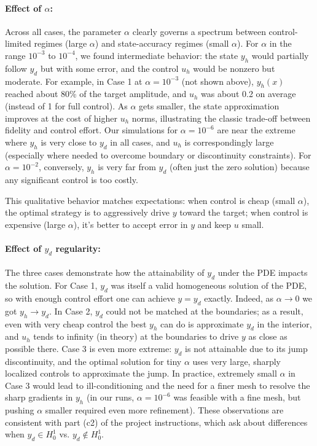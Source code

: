 \documentclass[a4paper,10pt]{article}
\begin{document}
\paragraph{Effect of $\alpha$:} Across all cases, the parameter $\alpha$ clearly governs a spectrum between control-limited regimes (large $\alpha$) and state-accuracy regimes (small $\alpha$). 
For $\alpha$ in the range $10^{-3}$ to $10^{-4}$, we found intermediate behavior: the state $y_h$ would partially follow $y_d$ but with some error, and the control $u_h$ would be nonzero but moderate. 
For example, in Case 1 at $\alpha=10^{-3}$ (not shown above), $y_h(x)$ reached about 80\% of the target amplitude, and $u_h$ was about 0.2 on average (instead of 1 for full control). As $\alpha$ gets smaller, the state approximation improves at the cost of higher $u_h$ norms, illustrating the classic trade-off between fidelity and control effort. Our simulations for $\alpha=10^{-6}$ are near the extreme where $y_h$ is very close to $y_d$ in all cases, and $u_h$ is correspondingly large (especially where needed to overcome boundary or discontinuity constraints). For $\alpha=10^{-2}$, conversely, $y_h$ is very far from $y_d$ (often just the zero solution) because any significant control is too costly.

This qualitative behavior matches expectations: when control is cheap (small $\alpha$), the optimal strategy is to aggressively drive $y$ toward the target; when control is expensive (large $\alpha$), it's better to accept error in $y$ and keep $u$ small.

\paragraph{Effect of $y_d$ regularity:} The three cases demonstrate how the attainability of $y_d$ under the PDE impacts the solution. For Case 1, $y_d$ was itself a valid homogeneous solution of the PDE, so with enough control effort one can achieve $y=y_d$ exactly. Indeed, as $\alpha\to 0$ we got $y_h\to y_d$. In Case 2, $y_d$ could not be matched at the boundaries; as a result, even with very cheap control the best $y_h$ can do is approximate $y_d$ in the interior, and $u_h$ tends to infinity (in theory) at the boundaries to drive $y$ as close as possible there. Case 3 is even more extreme: $y_d$ is not attainable due to its jump discontinuity, and the optimal solution for tiny $\alpha$ uses very large, sharply localized controls to approximate the jump. In practice, extremely small $\alpha$ in Case 3 would lead to ill-conditioning and the need for a finer mesh to resolve the sharp gradients in $y_h$ (in our runs, $\alpha=10^{-6}$ was feasible with a fine mesh, but pushing $\alpha$ smaller required even more refinement). These observations are consistent with part (c2) of the project instructions, which ask about differences when $y_d \in H^1_0$ vs. $y_d\notin H^1_0$.
\end{document}
